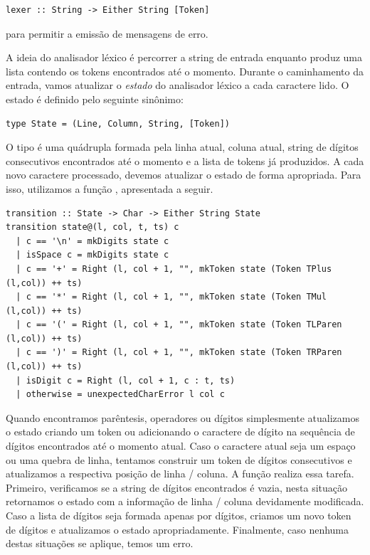 \begin{verbatim}
lexer :: String -> Either String [Token]
\end{verbatim}

para permitir a emissão de mensagens de erro.

A ideia do analisador léxico é percorrer a string de entrada enquanto
produz uma lista contendo os tokens encontrados até o momento.
Durante o caminhamento da entrada, vamos atualizar o \emph{estado} do
analisador léxico a cada caractere lido. O estado é definido pelo
seguinte sinônimo:

\begin{verbatim}
type State = (Line, Column, String, [Token])
\end{verbatim}

O tipo  é uma quádrupla formada pela
linha atual, coluna atual, string de dígitos consecutivos encontrados
até o momento e a lista de tokens já produzidos. A cada novo
caractere processado, devemos atualizar o estado de forma apropriada.
Para isso, utilizamos a função ,
apresentada a seguir.

\begin{verbatim}
transition :: State -> Char -> Either String State
transition state@(l, col, t, ts) c
  | c == '\n' = mkDigits state c
  | isSpace c = mkDigits state c
  | c == '+' = Right (l, col + 1, "", mkToken state (Token TPlus (l,col)) ++ ts)
  | c == '*' = Right (l, col + 1, "", mkToken state (Token TMul (l,col)) ++ ts)
  | c == '(' = Right (l, col + 1, "", mkToken state (Token TLParen (l,col)) ++ ts)
  | c == ')' = Right (l, col + 1, "", mkToken state (Token TRParen (l,col)) ++ ts)
  | isDigit c = Right (l, col + 1, c : t, ts)
  | otherwise = unexpectedCharError l col c
\end{verbatim}

Quando encontramos parêntesis, operadores ou dígitos simplesmente
atualizamos o estado criando um token ou adicionando o caractere de
dígito na sequência de dígitos encontrados até o momento atual. Caso
o caractere atual seja um espaço ou uma quebra de linha, tentamos
construir um token de dígitos consecutivos e atualizamos a respectiva
posição de linha / coluna. A função
 realiza essa tarefa. Primeiro,
verificamos se a string de dígitos encontrados é vazia, nesta
situação retornamos o estado com a informação de linha / coluna
devidamente modificada. Caso a lista de dígitos seja formada apenas
por dígitos, criamos um novo token de dígitos e atualizamos o estado
apropriadamente. Finalmente, caso nenhuma destas situações se
aplique, temos um erro.

